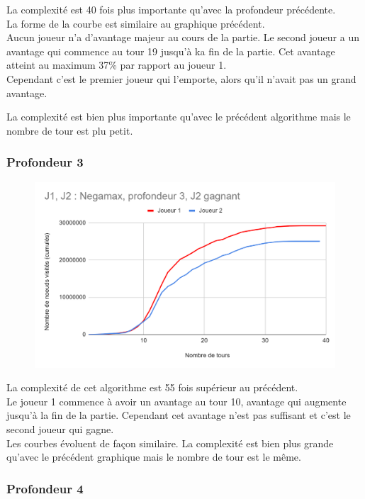 \documentclass[12pt]{article}
\begin{document}
La complexité est 40 fois plus importante qu’avec la profondeur précédente.\\
La forme de la courbe est similaire au graphique précédent.\\
Aucun joueur n’a d’avantage majeur au cours de la partie. Le second joueur a un avantage qui commence au tour 19 jusqu'à ka fin de la partie. Cet avantage atteint au maximum 37\% par rapport au joueur 1. \\
Cependant c’est le premier joueur qui l’emporte, alors qu’il n’avait pas un grand avantage.

La complexité est bien plus importante qu'avec le précédent algorithme mais le nombre de tour est plu petit.

\newpage
\subsubsection{Profondeur 3}

\begin{figure}[!h]
   \includegraphics[width=\textwidth]{prof3negamax.png}
\end{figure}

La complexité de cet algorithme est 55 fois supérieur au précédent.\\
Le joueur 1 commence à avoir un avantage au tour 10, avantage qui augmente jusqu’à la fin de la partie. Cependant cet avantage n’est pas suffisant et c’est le second joueur qui gagne.\\

Les courbes évoluent de façon similaire.
La complexité est bien plus grande qu'avec le précédent graphique mais le nombre de tour est le même.

\newpage
\subsubsection{Profondeur 4}
\end{document}
